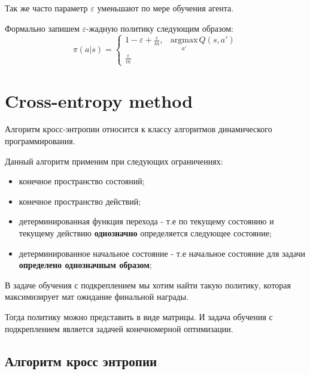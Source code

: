 Так же часто параметр $\varepsilon$ уменьшают по мере обучения агента.

Формально запишем $\varepsilon$-жадную политику следующим образом:
$$
\pi(a|s) = 
 \begin{cases}
	1 - \varepsilon + \frac{\varepsilon}{m},& \underset{a'}{\mathrm{arg max}}\, Q(s,a')\\
	\frac{\varepsilon}{m}
\end{cases}
$$

\section{Cross-entropy method}
Алгоритм кросс-энтропии относится к классу алгоритмов динамического программирования.

Данный алгоритм применим при следующих ограничениях:
\begin{itemize}
	\item конечное пространство состояний;
	\item конечное пространство действий;
	\item детерминированная функция перехода - т.е по текущему состоянию и текущему действию \textbf{однозначно} определяется следующее состояние;
	\item детерминированное начальное состояние - т.е начальное состояние для задачи \textbf{определено однозначным образом}; 
\end{itemize}

В задаче обучения с подкреплением мы хотим найти такую политику, которая максимизирует мат ожидание финальной награды.

Тогда политику можно представить в виде матрицы. И задача обучения с подкреплением является задачей конечномерной оптимизации.

\subsection{Алгоритм кросс энтропии}

